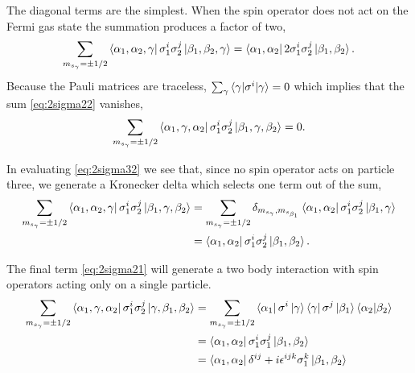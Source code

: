 The diagonal terms are the simplest. When the spin operator does not act on the Fermi gas state the summation produces a factor of two,
\begin{equation}\label{eq:2sigma33summed}
\sum_{m_{s_\gamma}=\pm1/2} \bra{\alpha_1,\alpha_2, \gamma } \sigma_1^i\sigma_2^j \ket{\beta_1, \beta_2, \gamma} = \bra{\alpha_1,\alpha_2 } 2 \sigma_1^i\sigma_2^j \ket{\beta_1, \beta_2}.
\end{equation}
Because the Pauli matrices are traceless, $\sum_\gamma\braket{\gamma| \sigma^i |\gamma}=0$ which implies that the sum \eqref{eq:2sigma22} vanishes,
\begin{equation}\label{eq:2sigma22summed}
\sum_{m_{s_\gamma}=\pm1/2} \bra{\alpha_1, \gamma, \alpha_2 } \sigma_1^i\sigma_2^j \ket{\beta_1, \gamma, \beta_2 }=0.
\end{equation}

In evaluating \eqref{eq:2sigma32} we see that, since no spin operator acts on particle three, we generate a Kronecker delta which selects one term out of the sum,
\begin{equation}
\begin{split}
\sum_{m_{s_\gamma}=\pm1/2} \bra{\alpha_1,\alpha_2, \gamma } \sigma_1^i\sigma_2^j \ket{\beta_1,  \gamma, \beta_2 }
& = \sum_{m_{s_\gamma}=\pm1/2}  \delta_{m_{s_\gamma},m_{s_{\beta_1}}} \bra{\alpha_1,\alpha_2 } \sigma_1^i\sigma_2^j \ket{\beta_1,  \gamma } \\
& =  \bra{\alpha_1,\alpha_2 } \sigma_1^i\sigma_2^j \ket{\beta_1,  \beta_2 }.
\end{split}
\end{equation}

The final term  \eqref{eq:2sigma21} will generate a two body interaction with spin operators acting only on a single particle. 
\begin{equation}\begin{split}
\sum_{m_{s_\gamma}=\pm1/2} \bra{\alpha_1, \gamma, \alpha_2 } \sigma_1^i\sigma_2^j \ket{\gamma, \beta_1, \beta_2 }
&= \sum_{m_{s_\gamma}=\pm1/2} \bra{\alpha_1} \sigma^i \ket{\gamma}\bra{\gamma}\sigma^j\ket{\beta_1}\braket{\alpha_2 | \beta_2} \\
&=\bra{\alpha_1, \alpha_2} \sigma_1^i \sigma_1^j\ket{\beta_1,\beta_2} \\
&=\bra{\alpha_1, \alpha_2} \delta^{ij}+i \epsilon^{ijk}\sigma_1^k \ket{\beta_1,\beta_2}
\end{split}
\end{equation}


